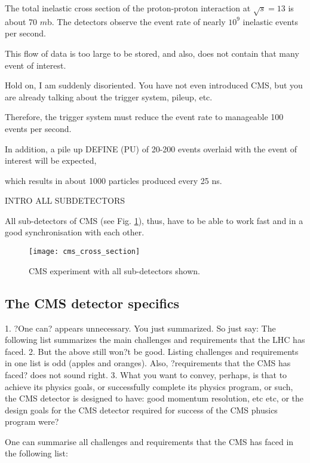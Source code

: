   
The total inelastic cross section of the proton-proton interaction at $\sqrt{s}=13$ is about 70 $m$b. The detectors observe the event rate of nearly $10^{9}$ inelastic events per second.

This flow of data is too large to be stored, and also, does not contain that many event of interest.
 
 
 Hold on, I am suddenly disoriented. You have not even introduced CMS, but you are already talking about the trigger system, pileup, etc.

 
 
  Therefore, the trigger system must reduce the event rate to manageable 100 events per second. 
  
  In addition, a pile up DEFINE (PU) of 20-200 events overlaid with the event of interest will be expected, 
  
  which results in about 1000 particles produced every 25 ns. 
  
  INTRO ALL SUBDETECTORS
  
  
  
  
  All sub-detectors of CMS (see Fig. \ref{cms_cross_section}), thus, have to be able to work fast and in a good synchronisation with each other. 


\begin{figure}[H]
  \centering
  \texttt{[image: cms\_cross\_section]}
  \caption{CMS experiment with all sub-detectors shown.}\label{cms_cross_section}
\end{figure}

\subsection{The CMS detector specifics}

1. ?One can? appears unnecessary. You just summarized. So just say: The following list summarizes the main challenges and requirements that the LHC has faced.
2. But the above still won?t be good. Listing challenges and requirements in one list is odd (apples and oranges). Also, ?requirements that the CMS has faced? does not sound right.
3. What you want to convey, perhaps, is that to achieve its physics goals, or successfully complete its physics program, or such, the CMS detector is designed to have: good momentum resolution, etc etc, or the design goals for the CMS detector required for success of the CMS phusics program were? 


One can summarise all challenges and requirements that the CMS has faced in the following list:

